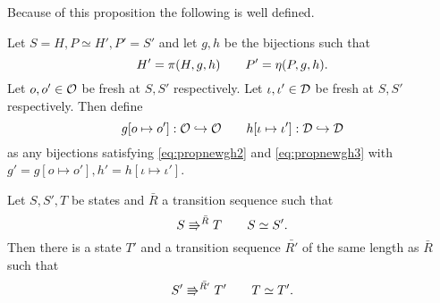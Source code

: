 Because of this proposition the following is well defined.

\begin{definition} \label{def:bijectionmod}
  Let $S = H, P \simeq H', P' = S'$ and let $g, h$ be the bijections such that
  \begin{equation} 
    H' = \pi(H, g, h) \quad\quad P' = \eta(P, g, h).
  \end{equation}
  Let $o, o' \in \mathcal{O}$ be fresh at $S, S'$ respectively.
  Let $\iota, \iota' \in \mathcal{D}$ be fresh at $S, S'$ respectively.
  Then define
  \begin{equation}
    g[o \mapsto o']: \mathcal{O} \hookrightarrow \mathcal{O} 
    \quad\quad h[\iota \mapsto \iota']: \mathcal{D} \hookrightarrow \mathcal{D}
  \end{equation}
  as any bijections satisfying \eqref{eq:propnewgh2} and \eqref{eq:propnewgh3}
  with $g' = g[o \mapsto o'], h' = h[\iota \mapsto \iota']$.
\end{definition}

\begin{lemma} \label{lem:lemma3}
  Let $S, S', T$ be states and $\bar{R}$ a transition sequence such that
  \begin{equation*}
    S \Rrightarrow^{\bar{R}} T \quad\quad S \simeq S'.
  \end{equation*}
  Then there is a state $T'$ and a transition sequence $\bar{R'}$ of the same
  length as $\bar{R}$ such that
  \begin{equation*}
    S' \Rrightarrow^{\bar{R'}} T' \quad\quad T \simeq T'.
  \end{equation*}
\end{lemma}


